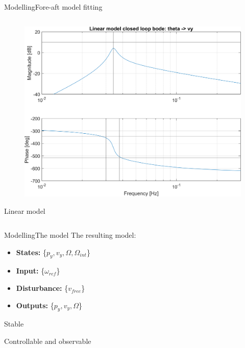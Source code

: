 \begin{frame}{Modelling}{Fore-aft model fitting}
\begin{columns}
		\begin{column}{.49\textwidth}
			\begin{figure}[ht]
				\centering
				\includegraphics[width=1\linewidth]{../Graphics/TestResults/foreaftFitting/wtLin_th-vy_16ms.png}
				\label{fig:wtlin_wref-vy_16}
			\end{figure}
		\centering Linear model
		\end{column}
		
	\end{columns}
	
\end{frame}


\begin{frame}{Modelling}{The model}
	The resulting model:
	
	\begin{itemize}
		\item \textbf{States:} \{$ p_y, v_y, \Omega, \Omega_{int} $\}
		\item \textbf{Input:} \{$ \omega_{ref} $\}
		\item \textbf{Disturbance:} \{$ v_{free} $\}
		\item \textbf{Outputs:} \{$ p_y, v_y, \Omega $\}
	\end{itemize}

	Stable
	
	\smallskip
	Controllable and observable
	
\end{frame}